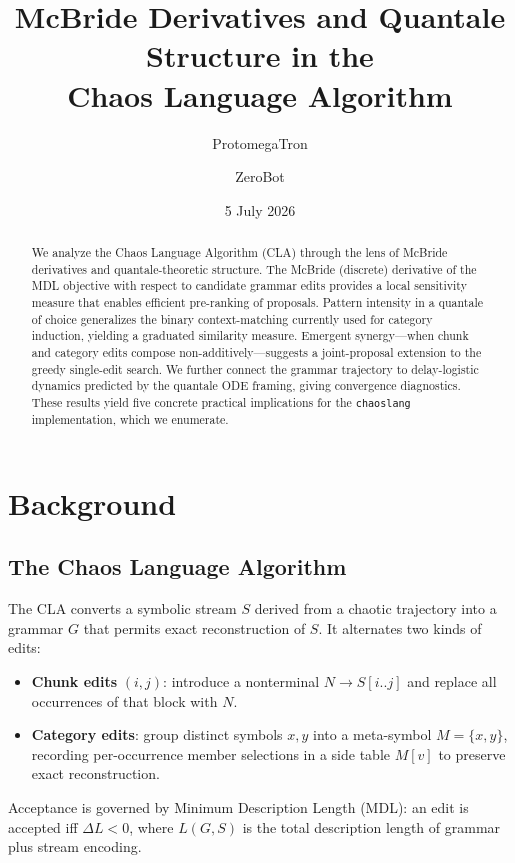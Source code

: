 \documentclass[11pt]{article}
\title{McBride Derivatives and Quantale Structure in the\\Chaos Language Algorithm}
\author{ProtomegaTron \and ZeroBot}
\date{5 July 2026}
\begin{document}
\maketitle

\begin{abstract}
We analyze the Chaos Language Algorithm (CLA) through the lens of McBride derivatives and quantale-theoretic structure. The McBride (discrete) derivative of the MDL objective with respect to candidate grammar edits provides a local sensitivity measure that enables efficient pre-ranking of proposals. Pattern intensity in a quantale of choice generalizes the binary context-matching currently used for category induction, yielding a graduated similarity measure. Emergent synergy---when chunk and category edits compose non-additively---suggests a joint-proposal extension to the greedy single-edit search. We further connect the grammar trajectory to delay-logistic dynamics predicted by the quantale ODE framing, giving convergence diagnostics. These results yield five concrete practical implications for the \texttt{chaoslang} implementation, which we enumerate.
\end{abstract}

\tableofcontents
\newpage

\section{Background}

\subsection{The Chaos Language Algorithm}

The CLA converts a symbolic stream $S$ derived from a chaotic trajectory into a grammar $G$ that permits exact reconstruction of $S$. It alternates two kinds of edits:
\begin{itemize}
    \item \textbf{Chunk edits} $(i,j)$: introduce a nonterminal $N \to S[i..j]$ and replace all occurrences of that block with $N$.
    \item \textbf{Category edits}: group distinct symbols $x, y$ into a meta-symbol $M = \{x, y\}$, recording per-occurrence member selections in a side table $M[v]$ to preserve exact reconstruction.
\end{itemize}
Acceptance is governed by Minimum Description Length (MDL): an edit is accepted iff $\Delta L < 0$, where $L(G, S)$ is the total description length of grammar plus stream encoding.
\end{document}
